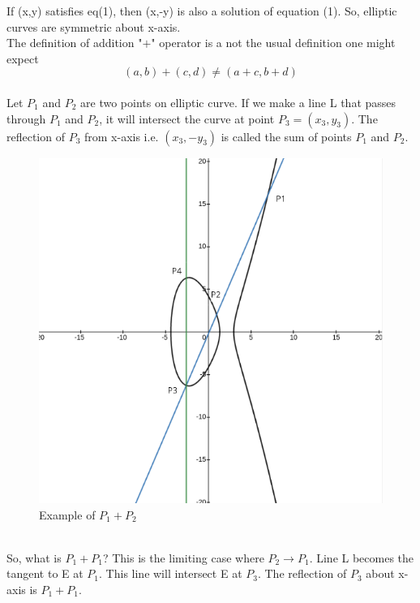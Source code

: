 \documentclass[a4paper,12pt]{report}
\begin{document}
If (x,y) satisfies eq(1), then (x,-y) is also a solution of equation (1). So, elliptic curves are symmetric about x-axis. \\
The definition of addition "$+$" operator is a not the usual definition one might expect\\
$$(a,b)+(c,d) \neq (a+c,b+d)$$
\\Let $P_1$ and $P_2$ are two points on elliptic curve. If we make a line L that passes through $P_1$ and $P_2$, it will intersect the curve at point $P_3=(x_3,y_3)$. The reflection of $P_3$ from x-axis i.e. $(x_3,-y_3)$ is called the sum of points $P_1$ and $P_2$.\\
\begin{figure}[h!]
	\begin{center}
		\caption{Example of $P_1+P_2$}
		\includegraphics[scale=0.4]{2}
	\end{center}
\end{figure}
\\So, what is $P_1+P_1$? This is the limiting case where $P_2 \to P_1$. Line L becomes the tangent to E at $P_1$. This line will intersect E at $P_3$. The reflection of $P_3$ about x-axis  is $P_1+P_1$.\\
\end{document}
